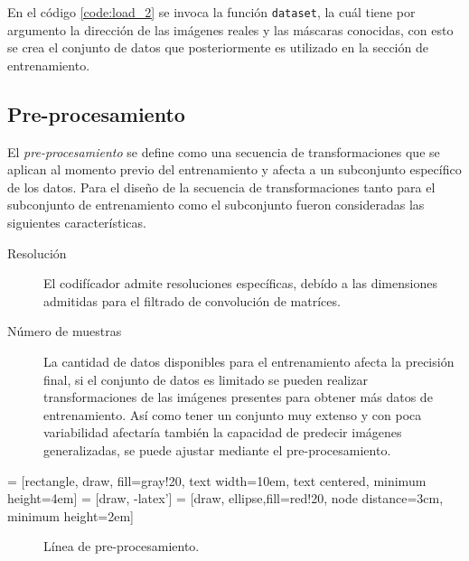 En el código \ref{code:load_2} se invoca la función \texttt{dataset}, la cuál tiene por argumento la dirección de las imágenes reales y las máscaras conocidas, con esto se crea el conjunto de datos que posteriormente es utilizado en la sección de entrenamiento.


\subsection{Pre-procesamiento}
El \emph{pre-procesamiento} se define como una secuencia de transformaciones que se aplican al momento previo del entrenamiento y afecta a un subconjunto específico de los datos. Para el diseño de la secuencia de transformaciones tanto para el subconjunto de entrenamiento como el subconjunto fueron consideradas las siguientes características.

\begin{description}
    \item[Resolución]{ El codifícador admite resoluciones específicas, debído a las dimensiones admitidas para el filtrado de convolución de matríces.}
    \item[Número de muestras]{La cantidad de datos disponibles para el entrenamiento afecta la precisión final, si el conjunto de datos es limitado se pueden realizar transformaciones de las imágenes presentes para obtener más datos de entrenamiento. Así como tener un conjunto muy extenso y con poca variabilidad afectaría también la capacidad de predecir imágenes generalizadas, se puede ajustar mediante el pre-procesamiento.}
    \item[] 
\end{description}


 = [rectangle, draw, fill=gray!20, 
    text width=10em, text centered, minimum height=4em]
 = [draw, -latex']
 = [draw, ellipse,fill=red!20, node distance=3cm,
    minimum height=2em]

\begin{figure}[H]
    \centering
    \caption{Línea de pre-procesamiento.}
    \label{fig: pipeline}
\end{figure}

